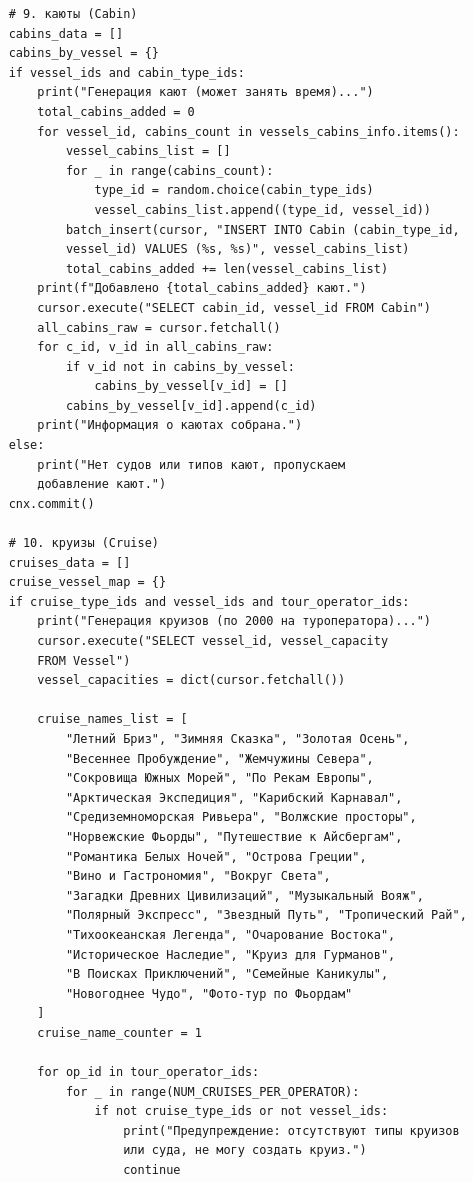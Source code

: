 \documentclass[11pt,a4paper,final]{article}
\begin{document}
{\begin{verbatim}
    # 9. каюты (Cabin)
    cabins_data = []
    cabins_by_vessel = {}
    if vessel_ids and cabin_type_ids:
        print("Генерация кают (может занять время)...")
        total_cabins_added = 0
        for vessel_id, cabins_count in vessels_cabins_info.items():
            vessel_cabins_list = []
            for _ in range(cabins_count):
                type_id = random.choice(cabin_type_ids)
                vessel_cabins_list.append((type_id, vessel_id))
            batch_insert(cursor, "INSERT INTO Cabin (cabin_type_id,
            vessel_id) VALUES (%s, %s)", vessel_cabins_list)
            total_cabins_added += len(vessel_cabins_list)
        print(f"Добавлено {total_cabins_added} кают.")
        cursor.execute("SELECT cabin_id, vessel_id FROM Cabin")
        all_cabins_raw = cursor.fetchall()
        for c_id, v_id in all_cabins_raw:
            if v_id not in cabins_by_vessel:
                cabins_by_vessel[v_id] = []
            cabins_by_vessel[v_id].append(c_id)
        print("Информация о каютах собрана.")
    else:
        print("Нет судов или типов кают, пропускаем 
        добавление кают.")
    cnx.commit()

    # 10. круизы (Cruise)
    cruises_data = []
    cruise_vessel_map = {}
    if cruise_type_ids and vessel_ids and tour_operator_ids:
        print("Генерация круизов (по 2000 на туроператора)...")
        cursor.execute("SELECT vessel_id, vessel_capacity 
        FROM Vessel")
        vessel_capacities = dict(cursor.fetchall())

        cruise_names_list = [
            "Летний Бриз", "Зимняя Сказка", "Золотая Осень", 
            "Весеннее Пробуждение", "Жемчужины Севера", 
            "Сокровища Южных Морей", "По Рекам Европы",
            "Арктическая Экспедиция", "Карибский Карнавал",
            "Средиземноморская Ривьера", "Волжские просторы",
            "Норвежские Фьорды", "Путешествие к Айсбергам",
            "Романтика Белых Ночей", "Острова Греции", 
            "Вино и Гастрономия", "Вокруг Света", 
            "Загадки Древних Цивилизаций", "Музыкальный Вояж",
            "Полярный Экспресс", "Звездный Путь", "Тропический Рай",
            "Тихоокеанская Легенда", "Очарование Востока", 
            "Историческое Наследие", "Круиз для Гурманов", 
            "В Поисках Приключений", "Семейные Каникулы",
            "Новогоднее Чудо", "Фото-тур по Фьордам"
        ]
        cruise_name_counter = 1

        for op_id in tour_operator_ids:
            for _ in range(NUM_CRUISES_PER_OPERATOR):
                if not cruise_type_ids or not vessel_ids:
                    print("Предупреждение: отсутствуют типы круизов
                    или суда, не могу создать круиз.")
                    continue


\end{verbatim}}
\end{document}
